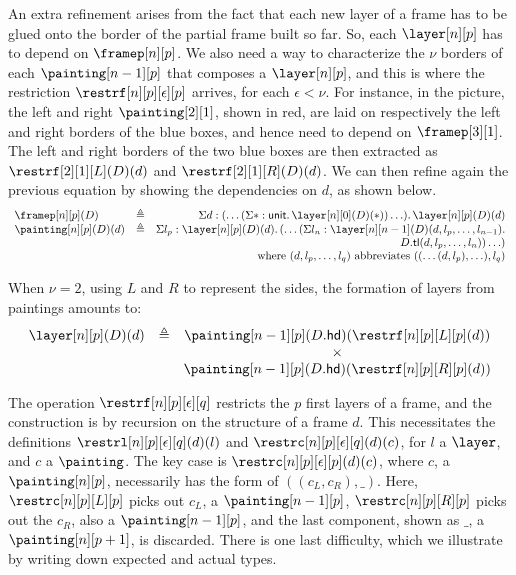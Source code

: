 \documentclass{msc}
\newcommand{\unittype}{\ensuremath{\mathsf{unit}}}
\newcommand{\unitpoint}{\ensuremath{\ast}}
\newcommand{\defeq}{\ensuremath{\triangleq}}
\newcommand{\tl}{\ensuremath{\mathsf{tl}}}
\newcommand{\hd}{\ensuremath{\mathsf{hd}}}
\begin{document}
An extra refinement arises from the fact that each new layer of a frame has to be glued onto the border of the partial frame built so far. So, each $\layer[n][p]$ has to depend on $\framep[n][p]$. We also need a way to characterize the $\nu$ borders of each $\painting[n-1][p]$ that composes a $\layer[n][p]$, and this is where the restriction $\restrf[n][p][\epsilon][p]$ arrives, for each $\epsilon < \nu$. For instance, in the picture, the left and right $\painting[2][1]$, shown in red, are laid on respectively the left and right borders of the blue boxes, and hence need to depend on $\framep[3][1]$. The left and right borders of the two blue boxes are then extracted as $\restrf[2][1][L](D)(d)$ and $\restrf[2][1][R](D)(d)$. We can then refine again the previous equation by showing the dependencies on $d$, as shown below.
\begin{equation*}
  \begin{array}{llr}
    \framep[n][p](D)      & \defeq & \Sigma d: (\ldots (\Sigma \unitpoint: \unittype.\, \layer[n][0](D)(\unitpoint)) \ldots).\, \layer[n][p](D)(d) \\
    \painting[n][p](D)(d) & \defeq & \Sigma l_p: \layer[n][p](D)(d).\, (\ldots (\Sigma l_n: \layer[n][n - 1](D)(d, l_p, \ldots, l_{n - 1}).        \\
                          &        & D.\tl(d, l_p, \ldots, l_n)) \ldots)                                                                           \\
                          &        & \text{where } (d, l_p, \ldots, l_q) \text{ abbreviates } ((\ldots(d, l_p), \ldots), l_q)
  \end{array}
\end{equation*}

When $\nu = 2$, using $L$ and $R$ to represent the sides, the formation of layers from paintings amounts to:
\begin{equation*}
  \begin{array}{llc}
    \layer[n][p](D)(d) & \defeq & \painting[n-1][p](D.\hd)(\restrf[n][p][L][p](d)) \\
                       &        & \times                                           \\
                       &        & \painting[n-1][p](D.\hd)(\restrf[n][p][R][p](d))
  \end{array}
\end{equation*}

The operation $\restrf[n][p][\epsilon][q]$ restricts the $p$ first layers of a frame, and the construction is by recursion on the structure of a frame $d$. This necessitates the definitions $\restrl[n][p][\epsilon][q](d)(l)$ and $\restrc[n][p][\epsilon][q](d)(c)$, for $l$ a $\layer$, and $c$ a $\painting$. The key case is $\restrc[n][p][\epsilon][p](d)(c)$, where $c$, a $\painting[n][p]$, necessarily has the form of $((c_L, c_R), \_)$. Here, $\restrc[n][p][L][p]$ picks out $c_L$, a $\painting[n-1][p]$, $\restrc[n][p][R][p]$ picks out the $c_R$, also a $\painting[n-1][p]$, and the last component, shown as $\_$, a $\painting[n][p+1]$, is discarded. There is one last difficulty, which we illustrate by writing down expected and actual types.
\end{document}
